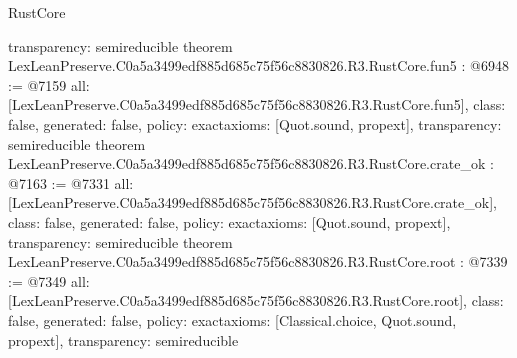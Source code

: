\begin{lexlean}{RustCore}
\begin{coremodule}
{  transparency: semireducible
}
theorem LexLeanPreserve.C0a5a3499edf885d685c75f56c8830826.R3.RustCore.fun5 : @6948 := @7159 {
  all: [LexLeanPreserve.C0a5a3499edf885d685c75f56c8830826.R3.RustCore.fun5],
  class: false,
  generated: false,
  policy: exact{axioms: [Quot.sound, propext]},
  transparency: semireducible
}
theorem LexLeanPreserve.C0a5a3499edf885d685c75f56c8830826.R3.RustCore.crate_ok : @7163 := @7331 {
  all: [LexLeanPreserve.C0a5a3499edf885d685c75f56c8830826.R3.RustCore.crate_ok],
  class: false,
  generated: false,
  policy: exact{axioms: [Quot.sound, propext]},
  transparency: semireducible
}
theorem LexLeanPreserve.C0a5a3499edf885d685c75f56c8830826.R3.RustCore.root : @7339 := @7349 {
  all: [LexLeanPreserve.C0a5a3499edf885d685c75f56c8830826.R3.RustCore.root],
  class: false,
  generated: false,
  policy: exact{axioms: [Classical.choice, Quot.sound, propext]},
  transparency: semireducible
}


\end{coremodule}
\end{lexlean}
